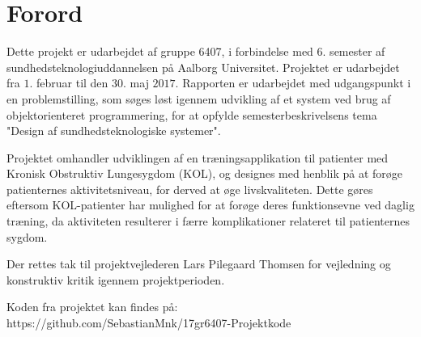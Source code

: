 \chapter*{Forord}

Dette projekt er udarbejdet af gruppe 6407, i forbindelse med $6$. semester af sundhedsteknologiuddannelsen på Aalborg Universitet. Projektet er udarbejdet fra $1$. februar til den $30$. maj $2017$. Rapporten er udarbejdet med udgangspunkt i en problemstilling, som søges løst igennem udvikling af et system ved brug af objektorienteret programmering, for at opfylde semesterbeskrivelsens tema "Design af sundhedsteknologiske systemer".

Projektet omhandler udviklingen af en træningsapplikation til patienter med Kronisk Obstruktiv Lungesygdom (KOL), og designes med henblik på at forøge patienternes aktivitetsniveau, for derved at øge livskvaliteten. Dette gøres eftersom KOL-patienter har mulighed for at forøge deres funktionsevne ved daglig træning, da aktiviteten resulterer i færre komplikationer relateret til patienternes sygdom. 

Der rettes tak til projektvejlederen Lars Pilegaard Thomsen for vejledning og konstruktiv kritik igennem projektperioden. 

Koden fra projektet kan findes på:\\ https://github.com/SebastianMnk/17gr6407-Projektkode

\pagebreak